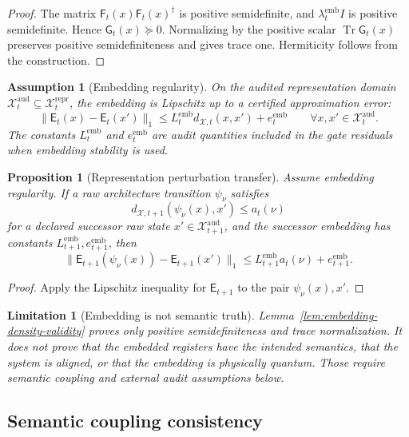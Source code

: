 \documentclass[11pt,a4paper]{article}
\newtheorem{proposition}[theorem]{Proposition}
\newtheorem{assumption}[theorem]{Assumption}
\newtheorem{limitation}[theorem]{Limitation}
\newcommand{\Xcal}{\mathcal X}
\newcommand{\Tr}{\operatorname{Tr}}
\newcommand{\aud}{\mathrm{aud}}
\newcommand{\reptype}{\mathrm{repr}}
\newcommand{\emb}{\mathrm{emb}}
\begin{document}
\begin{proof}
The matrix \(\mathsf F_t(x)\mathsf F_t(x)^\dagger\) is positive semidefinite, and \(\lambda_t^{\emb}I\) is positive semidefinite. Hence \(\mathsf G_t(x)\succeq0\). Normalizing by the positive scalar \(\Tr\mathsf G_t(x)\) preserves positive semidefiniteness and gives trace one. Hermiticity follows from the construction.
\end{proof}

\begin{assumption}[Embedding regularity]
On the audited representation domain \(\Xcal_t^{\aud}\subseteq\Xcal_t^{\reptype}\), the embedding is Lipschitz up to a certified approximation error:
\[
\lVert \mathsf E_t(x)-\mathsf E_t(x')\rVert_1
\le
L_t^{\emb} d_{\Xcal,t}(x,x')+e_t^{\emb}
\qquad \forall x,x'\in\Xcal_t^{\aud}.
\]
The constants \(L_t^{\emb}\) and \(e_t^{\emb}\) are audit quantities included in the gate residuals when embedding stability is used.
\end{assumption}

\begin{proposition}[Representation perturbation transfer]
\label{prop:representation-perturbation-transfer}
Assume embedding regularity. If a raw architecture transition \(\psi_\nu\) satisfies
\[
d_{\Xcal,t+1}(\psi_\nu(x),x')\le a_t(\nu)
\]
for a declared successor raw state \(x'\in\Xcal_{t+1}^{\aud}\), and the successor embedding has constants \(L_{t+1}^{\emb},e_{t+1}^{\emb}\), then
\[
\lVert \mathsf E_{t+1}(\psi_\nu(x))-\mathsf E_{t+1}(x')\rVert_1
\le
L_{t+1}^{\emb}a_t(\nu)+e_{t+1}^{\emb}.
\]
\end{proposition}

\begin{proof}
Apply the Lipschitz inequality for \(\mathsf E_{t+1}\) to the pair \(\psi_\nu(x),x'\).
\end{proof}

\begin{limitation}[Embedding is not semantic truth]
Lemma~\ref{lem:embedding-density-validity} proves only positive semidefiniteness and trace normalization. It does not prove that the embedded registers have the intended semantics, that the system is aligned, or that the embedding is physically quantum. Those require semantic coupling and external audit assumptions below.
\end{limitation}

\subsection{Semantic coupling consistency}
\end{document}
